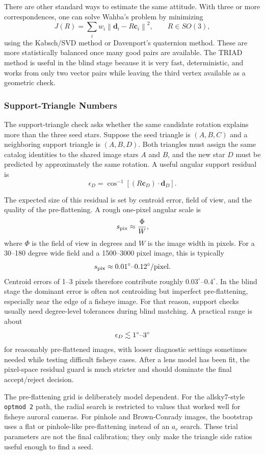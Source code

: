 \documentclass[11pt]{article}
\begin{document}
There are other standard ways to estimate the same attitude. With three or
more correspondences, one can solve Wahba's problem by minimizing
\[
  J(R) =
  \sum_i w_i
  \left\|
    \mathbf{d}_i - R\mathbf{c}_i
  \right\|^2 ,
  \qquad R\in SO(3),
\]
using the Kabsch/SVD method or Davenport's quaternion method. These are more
statistically balanced once many good pairs are available. The TRIAD method is
useful in the blind stage because it is very fast, deterministic, and works
from only two vector pairs while leaving the third vertex available as a
geometric check.

\subsubsection{Support-Triangle Numbers}

The support-triangle check asks whether the same candidate rotation explains
more than the three seed stars. Suppose the seed triangle is \((A,B,C)\) and a
neighboring support triangle is \((A,B,D)\). Both triangles must assign the
same catalog identities to the shared image stars \(A\) and \(B\), and the
new star \(D\) must be predicted by approximately the same rotation. A useful
angular support residual is
\[
  \epsilon_D =
  \cos^{-1}\!\left[
    \left(R\mathbf{c}_D\right)\cdot \mathbf{d}_D
  \right].
\]

The expected size of this residual is set by centroid error, field of view,
and the quality of the pre-flattening. A rough one-pixel angular scale is
\[
  s_{\rm pix} \approx \frac{\Phi}{W},
\]
where \(\Phi\) is the field of view in degrees and \(W\) is the image width in
pixels. For a 30--180 degree wide field and a 1500--3000 pixel image, this is
typically
\[
  s_{\rm pix} \approx 0.01^\circ\hbox{--}0.12^\circ/{\rm pixel}.
\]
Centroid errors of 1--3 pixels therefore contribute roughly
\(0.03^\circ\)--\(0.4^\circ\). In the blind stage the dominant error is often
not centroiding but imperfect pre-flattening, especially near the edge of a
fisheye image. For that reason, support checks usually need degree-level
tolerances during blind matching. A practical range is about
\[
  \epsilon_D \lesssim 1^\circ\hbox{--}3^\circ
\]
for reasonably pre-flattened images, with looser diagnostic settings sometimes
needed while testing difficult fisheye cases. After a lens model has been fit,
the pixel-space residual guard is much stricter and should dominate the final
accept/reject decision.

The pre-flattening grid is deliberately model dependent. For the allsky7-style
\texttt{optmod 2} path, the radial search is restricted to values that worked
well for fisheye auroral cameras. For pinhole and Brown-Conrady images, the
bootstrap uses a flat or pinhole-like pre-flattening instead of an \(a_r\)
search. These trial parameters are not the final calibration; they only make
the triangle side ratios useful enough to find a seed.
\end{document}
